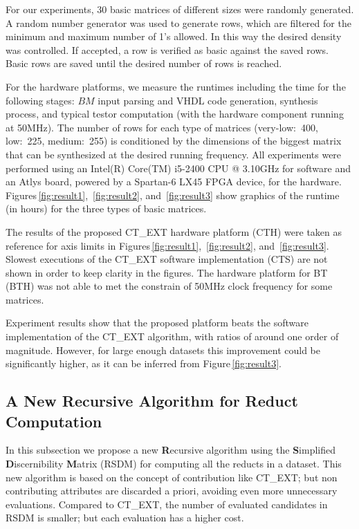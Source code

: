 \documentclass[authoryear,11pt]{elsarticle}
\begin{document}
	For our experiments, 30 basic matrices of different sizes were randomly generated. 
	A random number generator was used to generate rows, which are
	filtered for the minimum and maximum number of 1's allowed. In this way the desired density was
	controlled. If accepted, a row is verified as basic against the saved rows. Basic rows 
	are saved until the desired number of rows is reached. 
	
	For the hardware platforms, we measure the runtimes including the time for the following stages: $BM$ 
	input parsing and VHDL code generation, synthesis process, and typical testor computation (with the
	hardware component running at 50MHz). The number of rows for each type of matrices (very-low:~400, low:~225,
	medium:~255) is conditioned by the dimensions of the biggest matrix that can be synthesized at the desired
	running frequency.
	All experiments were performed using an Intel(R) Core(TM) i5-2400 CPU @ 3.10GHz for software and 
	an Atlys board, powered by a Spartan-6 LX45 FPGA device, for the hardware.
	Figures\,\ref{fig:result1}, \,\ref{fig:result2}, and \,\ref{fig:result3} show graphics of the runtime 
	(in hours) for the three types of basic matrices. 
	
	The results of the proposed CT\_EXT hardware platform (CTH) were taken as reference for axis limits in 
	Figures\,\ref{fig:result1}, \,\ref{fig:result2}, and \,\ref{fig:result3}.
	Slowest executions of the CT\_EXT software implementation (CTS) are not shown in order to keep clarity in 
	the figures. 
	The hardware platform for BT (BTH) was not able to met the constrain of 50MHz clock frequency for some 
	matrices.
	
	Experiment results show that the proposed platform beats the software implementation of
	the CT\_EXT algorithm, with ratios of around one order of magnitude. However, for large 
	enough datasets this improvement could be significantly higher, as it can be inferred from 
	Figure\,\ref{fig:result3}.


\subsection{A New Recursive Algorithm for Reduct Computation}\label{RSDM}
	In this subsection we propose a new \textbf{R}ecursive algorithm using the \textbf{S}implified 
	\textbf{D}iscernibility \textbf{M}atrix (RSDM) for computing all the reducts in a dataset. This
	new algorithm is based on the concept of contribution like CT\_EXT; but non contributing attributes
	are discarded a priori, avoiding even more unnecessary evaluations. Compared to CT\_EXT, the number 
	of evaluated candidates in RSDM is smaller; but each evaluation has a higher cost. 
\end{document}
